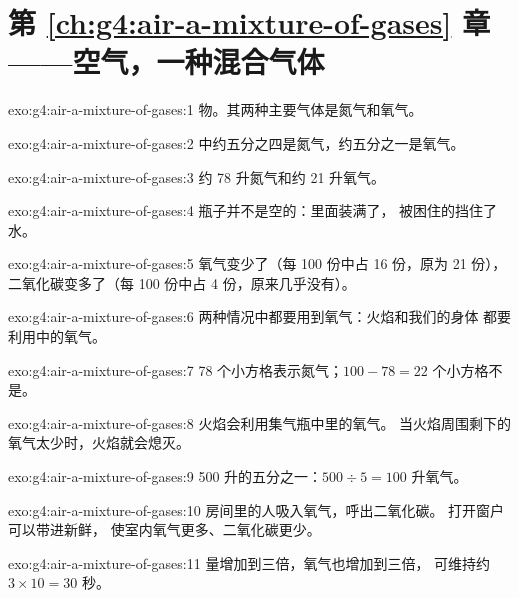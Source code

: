 \section*{第 \ref{ch:g4:air-a-mixture-of-gases} 章——空气，一种混合气体}

\begin{solution}{exo:g4:air-a-mixture-of-gases:1}
物。其两种主要气体是氮气和氧气。
\end{solution}

\begin{solution}{exo:g4:air-a-mixture-of-gases:2}
中约五分之四是氮气，约五分之一是氧气。
\end{solution}

\begin{solution}{exo:g4:air-a-mixture-of-gases:3}
约 78 升氮气和约 21 升氧气。
\end{solution}

\begin{solution}{exo:g4:air-a-mixture-of-gases:4}
瓶子并不是空的：里面装满了，
被困住的挡住了水。
\end{solution}

\begin{solution}{exo:g4:air-a-mixture-of-gases:5}
氧气变少了（每 100 份中占 16 份，原为 21 份），
二氧化碳变多了（每 100 份中占 4 份，原来几乎没有）。
\end{solution}

\begin{solution}{exo:g4:air-a-mixture-of-gases:6}
两种情况中都要用到氧气：火焰和我们的身体
都要利用中的氧气。
\end{solution}

\begin{solution}{exo:g4:air-a-mixture-of-gases:7}
78 个小方格表示氮气；$100 - 78 = 22$ 个小方格不是。
\end{solution}

\begin{solution}{exo:g4:air-a-mixture-of-gases:8}
火焰会利用集气瓶中里的氧气。
当火焰周围剩下的氧气太少时，火焰就会熄灭。
\end{solution}

\begin{solution}{exo:g4:air-a-mixture-of-gases:9}
500 升的五分之一：$500 \div 5 = 100$ 升氧气。
\end{solution}

\begin{solution}{exo:g4:air-a-mixture-of-gases:10}
房间里的人吸入氧气，呼出二氧化碳。
打开窗户可以带进新鲜，
使室内氧气更多、二氧化碳更少。
\end{solution}

\begin{solution}{exo:g4:air-a-mixture-of-gases:11}
量增加到三倍，氧气也增加到三倍，
可维持约 $3 \times 10 = 30$ 秒。
\end{solution}
